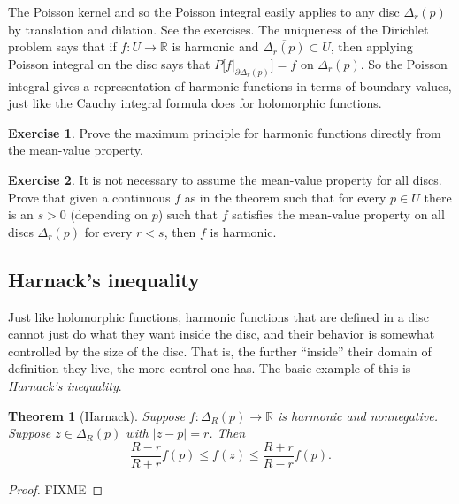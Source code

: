 \documentclass[12pt,openany]{book}
\newcommand{\sabs}[1]{\lvert {#1} \rvert}
\newcommand{\R}{{\mathbb{R}}}
\newcommand{\myindex}[1]{#1\index{#1}}
\theoremstyle{plain}
\newtheorem{thm}{Theorem}[section]
\theoremstyle{remark}
\theoremstyle{definition}
\newenvironment{exbox}{%
    \def\FrameCommand{\vrule width 1pt \relax\hspace {10pt}}%
    \MakeFramed {\advance \hsize -\width \FrameRestore }%
}{%
    \endMakeFramed
}
\theoremstyle{exercise}
\newtheorem{exercise}{Exercise}[section]
\theoremstyle{example}
\begin{document}
The Poisson kernel and so the Poisson integral easily applies to any disc
$\Delta_r(p)$ by translation and dilation.  See the exercises.
The uniqueness of the Dirichlet problem says that if $f \colon U \to \R$
is harmonic and $\overline{\Delta_r(p)} \subset U$, then applying
Poisson integral on the disc says that $P\bigl[f|_{\partial
\Delta_r(p)}\bigr] = f$ on $\Delta_r(p)$.  So the Poisson integral gives
a representation of harmonic functions in terms of boundary values, just
like the Cauchy integral formula does for holomorphic functions.

\begin{exbox}
\begin{exercise}
Prove the maximum principle for harmonic functions directly from the
mean-value property.
\end{exercise}

\begin{exercise} \label{exercise:meanvaluesmallronly}
It is not necessary to assume the mean-value property for all discs.  Prove
that given a continuous $f$ as in the theorem such that for every $p \in U$
there is an $s > 0$ (depending on $p$) such that $f$ satisfies the mean-value
property on all discs $\Delta_r(p)$ for every $r < s$, then $f$ is
harmonic.
\end{exercise}
\end{exbox}

\subsection{Harnack's inequality}

Just like holomorphic functions, harmonic functions that are defined in a
disc cannot just do what they want inside the disc, and their behavior is
somewhat controlled by the size of the disc.  That is, the further
``inside'' their domain of definition they live, the more control one has.
The basic example of this is \emph{\myindex{Harnack's inequality}}.

\begin{thm}[Harnack]
Suppose $f \colon \Delta_R(p) \to \R$ is harmonic and nonnegative.
Suppose $z \in \Delta_R(p)$ with $\sabs{z-p} = r$.  Then
\begin{equation*}
\frac{R-r}{R+r} f(p) \leq f(z) \leq \frac{R+r}{R-r} f(p) .
\end{equation*}
\end{thm}

\begin{proof}
FIXME
\end{proof}
\end{document}
